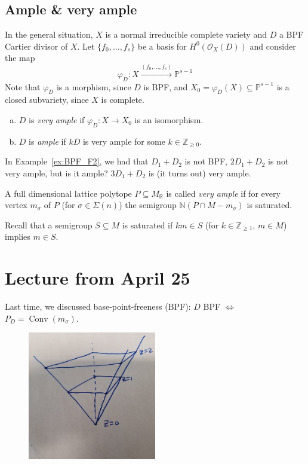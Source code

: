\documentclass[a4paper,12pt]{amsart}
\newcommand{\ZZ}{\mathbb{Z}}
\newcommand{\RR}{\mathbb{R}}
\newcommand{\PP}{\mathbb{P}}
\newcommand{\NN}{\mathbb{N}}
\DeclareMathOperator{\Conv}{Conv}
\begin{document}
\subsection{Ample \& very ample}

In the general situation, $X$ is a normal irreducible complete variety and $D$ a BPF Cartier divisor of $X$. Let $\{f_0,\dots,f_s\}$ be a basis for $H^0(\mathcal{O}_X(D))$ and consider the map
$$
\varphi_D : X \xrightarrow{(f_0,\dots,f_s)} \PP^{s-1}
$$
Note that $\varphi_D$ is a morphism, since $D$ is BPF, and $X_0 = \varphi_D(X) \subseteq \PP^{s-1}$ is a closed subvariety, since $X$ is complete.
\begin{enumerate}[(a)]
\item $D$ is \emph{very ample} if $\varphi_D : X \longrightarrow X_0$ is an isomorphism.
\item $D$ is \emph{ample} if $kD$ is very ample for some $k \in \ZZ_{\geq 0}$. 
\end{enumerate}

In Example~\ref{ex:BPF_F2}, we had that $D_1+D_2$ is not BPF, $2D_1+D_2$ is not very ample, but is it ample? $3D_1+D_2$ is (it turns out) very ample.

\begin{definition}
A full dimensional lattice polytope $P \subseteq M_\RR$ is called \emph{very ample} if for every vertex $m_\sigma$ of $P$ (for $\sigma \in \Sigma(n)$) the semigroup $\NN(P\cap M - m_\sigma)$ is saturated.
\end{definition}

Recall that a semigroup $S \subseteq M$ is saturated if $km \in S$ (for $k \in \ZZ_{\geq 1}$, $m \in M$) implies $m \in S$.

\newpage
\section{Lecture from April 25}

Last time, we discussed base-point-freeness (BPF): $D$ BPF $\Leftrightarrow$ $P_D = \Conv (m_\sigma)$.

\begin{figure}[h]
	\centering
	\includegraphics[width=0.5\textwidth]{pic/Apr_25_cone}
\end{figure}
\end{document}
